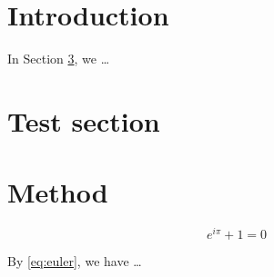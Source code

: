 \documentclass[]{article}
\begin{document}
\section{Introduction}
\label{sec:intro}

In Section \ref{sec:method}, we \ldots

\section{Test section}

\section{Method}
\label{sec:method}

\begin{equation}
    \label{eq:euler}
    e^{i\pi} + 1 = 0
\end{equation}

By \eqref{eq:euler}, we have \ldots
\end{document}
